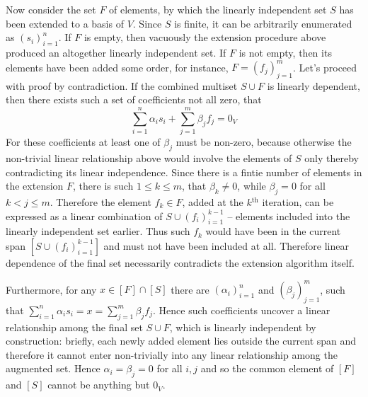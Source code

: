\documentclass[a4paper]{article}
\newcommand{\brac}[1]{\ensuremath{\left( #1 \right)}}
\newcommand{\susc}[1]{\ensuremath{^{\textrm{#1}}}}
\newcommand{\spn}[1]{\ensuremath{\left[ #1 \right]}}
\begin{document}
Now consider the set $F$ of elements, by which the linearly independent set $S$ has been extended to a basis of $V$. Since $S$ is finite, it can be arbitrarily enumerated as $\brac{s_i}_{i=1}^n$. If $F$ is empty, then vacuously the extension procedure above produced an altogether linearly independent set. If $F$ is not empty, then  its elements have been added some order, for instance, $F = \brac{f_j}_{j=1}^m$. Let's proceed with proof by contradiction. If the combined multiset $S\cup F$ is linearly dependent, then there exists such a set of coefficients not all zero, that \[\sum_{i=1}^n \alpha_i s_i + \sum_{j=1}^m \beta_j f_j = 0_V\] For these coefficients at least one of $\beta_j$ must be non-zero, because otherwise the non-trivial linear relationship above would involve the elements of $S$ only thereby contradicting its linear independence. Since there is a fintie number of elements in the extension $F$, there is such $1\leq k\leq m$, that $\beta_k \neq 0$, while $\beta_j=0$ for all $k<j\leq m$. Therefore the element $f_k\in F$, added at the $k\susc{th}$ iteration,  can be expressed as a linear combination of $S \cup \brac{f_i}_{i=1}^{k-1}$ -- elements included into the linearly independent set earlier. Thus such $f_k$ would have been in the current span $\spn{S \cup \brac{f_i}_{i=1}^{k-1}}$ and must not have been included at all. Therefore linear dependence of the final set necessarily contradicts the extension algorithm itself.

Furthermore, for any $x\in \spn{F}\cap \spn{S}$ there are $\brac{\alpha_i}_{i=1}^n$ and $\brac{\beta_j}_{j=1}^m$, such that $\sum_{i=1}^n \alpha_i s_i = x = \sum_{j=1}^m \beta_j f_j$. Hence such coefficients uncover a linear relationship among the final set $S\cup F$, which is linearly independent by construction: briefly, each newly added element lies outside the current span and therefore it cannot enter non-trivially into any linear relationship among the augmented set. Hence $\alpha_i = \beta_j = 0$ for all $i, j$ and so the common element of $\spn{F}$ and $\spn{S}$ cannot be anything but $0_V$.
\end{document}

